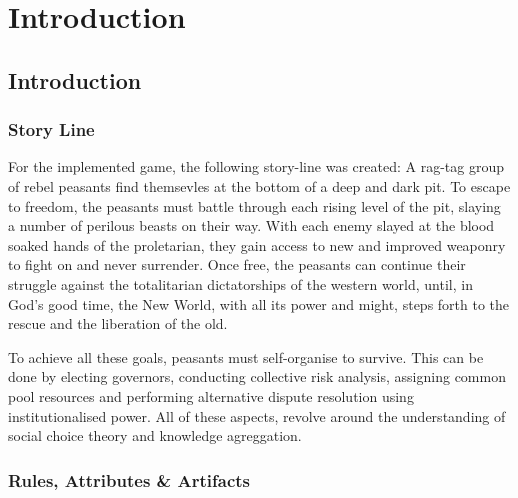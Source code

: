 \chapter{Introduction}\label{introduction}

\section{Introduction}\label{sec:intro}



\subsection{Story Line}\label{sec:story line}

For the implemented game, the following story-line was created: A rag-tag group of rebel peasants find themsevles at the bottom of a deep and dark pit. To escape to freedom, the peasants must battle through each rising level of the pit, slaying a number of perilous beasts on their way. With each enemy slayed at the blood soaked hands of the proletarian, they gain access to new and improved weaponry to fight on and never surrender. Once free, the peasants can continue their struggle against the totalitarian dictatorships of the western world, until, in God's good time, the New World, with all its power and might, steps forth to the rescue and the liberation of the old.  

To achieve all these goals, peasants must self-organise to survive. This can be done by electing governors, conducting collective risk analysis, assigning common pool resources and performing alternative dispute resolution using institutionalised power. All of these aspects, revolve around the understanding of social choice theory and knowledge agreggation. 


\subsection{Rules, Attributes \& Artifacts}\label{sec:rules}


